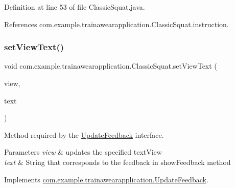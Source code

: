 Definition at line 53 of file Classic\+Squat.\+java.


\begin{DoxyCode}{0}

\end{DoxyCode}


References com.\+example.\+trainawearapplication.\+Classic\+Squat.\+instruction.

\mbox{\label{classcom_1_1example_1_1trainawearapplication_1_1_classic_squat_ab193e39e2f1255fd88d0508cfe7a63ff}} 
\subsubsection{\texorpdfstring{setViewText()}{setViewText()}}
{\footnotesize\ttfamily void com.\+example.\+trainawearapplication.\+Classic\+Squat.\+set\+View\+Text (\begin{DoxyParamCaption}\item[{Text\+View}]{view,  }\item[{String}]{text }\end{DoxyParamCaption})\hspace{0.3cm}{\ttfamily [inline]}}



Method required by the \mbox{\hyperlink{interfacecom_1_1example_1_1trainawearapplication_1_1_update_feedback}{Update\+Feedback}} interface. 


\begin{DoxyParams}{Parameters}
{\em view} & updates the specified text\+View \\
\hline
{\em text} & String that corresponds to the feedback in show\+Feedback method \\
\hline
\end{DoxyParams}


Implements \mbox{\hyperlink{interfacecom_1_1example_1_1trainawearapplication_1_1_update_feedback_a7a026880188b11aca6d8184d57e699e8}{com.\+example.\+trainawearapplication.\+Update\+Feedback}}.



